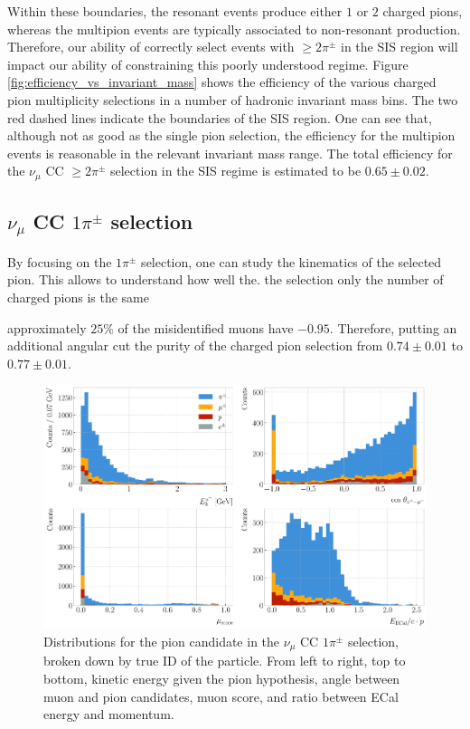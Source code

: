 Within these boundaries, the resonant events produce either $1$ or $2$ charged pions, whereas the multipion events are typically associated to non-resonant production. Therefore, our ability of correctly select events with $\geq 2\pi^{\pm}$ in the SIS region will impact our ability of constraining this poorly understood regime. Figure \ref{fig:efficiency_vs_invariant_mass} shows the efficiency of the various charged pion multiplicity selections in a number of hadronic invariant mass bins. The two red dashed lines indicate the boundaries of the SIS region. One can see that, although not as good as the single pion selection, the efficiency for the multipion events is reasonable in the relevant invariant mass range. The total efficiency for the $\nu_{\mu}$ CC $\geq 2\pi^{\pm}$ selection in the SIS regime is estimated to be $0.65 \pm 0.02$.

\subsection[\texorpdfstring{$\nu_{\mu}$}{numu} CC \texorpdfstring{$1\pi^{\pm}$}{1pi} selection]{\boldmath\texorpdfstring{$\nu_{\mu}$}{numu} CC \boldmath\texorpdfstring{$1\pi^{\pm}$}{1pi} selection}

By focusing on the $1\pi^{\pm}$ selection, one can study the kinematics of the selected pion. This allows to understand how well the. the selection only the number of charged pions is the same 

approximately $25\%$ of the misidentified muons have $-0.95$. Therefore, putting an additional angular cut the purity of the charged pion selection from $0.74 \pm 0.01$ to $0.77 \pm 0.01$.

\begin{figure}[t]
    \centering
    \includegraphics[width=.99\linewidth]{Images/GAr_selection/pion_selection_1pion_kinematics.pdf}
    \caption[Efficiency of the $\nu_{\mu}$ CC $N\pi^{\pm}$ selections as a function of the hadronic invariant mass.]{Distributions for the pion candidate in the $\nu_{\mu}$ CC $1\pi^{\pm}$ selection, broken down by true ID of the particle. From left to right, top to bottom, kinetic energy given the pion hypothesis, angle between muon and pion candidates, muon score, and ratio between ECal energy and momentum.}
    \label{fig:1pion_kinematics}
\end{figure}

